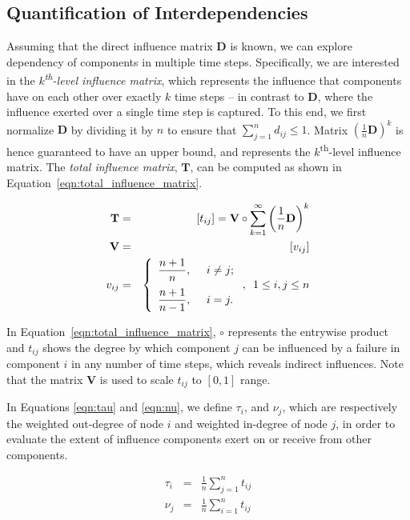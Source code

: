 \documentclass[12pt]{elsarticle}
\begin{document}
\subsection{Quantification of Interdependencies}
\label{sec:analysis:quan}
Assuming that the direct influence matrix $\mathbf{D}$ is known, we can explore dependency of components in multiple time steps. Specifically, we are interested in the \emph{$k$\textsuperscript{th}-level influence matrix}, which represents the influence that components have on each other over exactly $k$ time steps -- in contrast to $\mathbf{D}$, where the influence exerted over a single time step is captured. To this end, we first normalize $\mathbf{D}$ by dividing it by $n$ to ensure that $\sum\limits_{j=1}^n d_{ij} \leq 1$. Matrix $\left(\frac{1}{n}\mathbf{D}\right)^k$ is hence guaranteed to have an upper bound, and represents the $k$\textsuperscript{th}-level influence matrix. The \emph{total influence matrix}, $\mathbf{T}$, can be computed as shown in Equation~\eqref{eqn:total_influence_matrix}.

\begin{eqnarray}
\label{eqn:total_influence_matrix}
\mathbf{T} &=& \left[t_{ij}\right] = \mathbf{V} \circ \sum\limits_{k = 1}^{\infty} \left(\frac{1}{n}\mathbf{D}\right)^k \nonumber \\
\mathbf{V} &=& [v_{ij}] \nonumber \\
v_{ij} &=&
\left\{
\begin{array}{ll}
  \dfrac{n+1}{n}, & \enskip i \neq j; \\[1em]
  \dfrac{n+1}{n-1}, & \enskip i = j.
\end{array}
\right.
, \enskip 1 \leq i,j \leq n
\end{eqnarray}

In Equation~\eqref{eqn:total_influence_matrix}, $\circ$ represents the entrywise product and  $t_{ij}$ shows the degree by which component $j$ can be influenced by a failure in component $i$ in any number of time steps, which reveals indirect influences. Note that the matrix $\mathbf{V}$ is used to scale $t_{ij}$ to $[0, 1]$ range.

In Equations \eqref{eqn:tau} and \eqref{eqn:nu}, we define $\tau_i$, and $\nu_j$, which are respectively the weighted out-degree of node $i$ and weighted in-degree of node $j$, in order to evaluate the extent of influence components exert on or receive from other components.

\begin{eqnarray}
\label{eqn:tau}
\tau_{i} &=& \frac{1}{n} \sum\limits_{j=1}^{n} t_{ij} \\
\label{eqn:nu}
\nu_{j} &=& \frac{1}{n} \sum\limits_{i=1}^{n} t_{ij}
\end{eqnarray}
\end{document}
